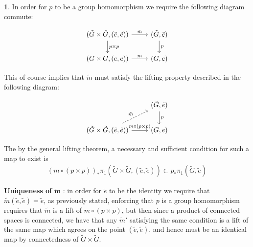 \documentclass[10.5pt]{article}
\theoremstyle{definition}
\newtheorem{pb}{}
\begin{document}
    \newpage
    \begin{pb}
        In order for \(p\) to be a group homomorphism we require the following diagram commute:

        \begin{equation*} 
            \begin{tikzcd}
                (\tilde{G} \times \tilde{G},(\tilde{e},\tilde{e}))\arrow[r, "\tilde{m}"] \arrow[d, "p \times p"]& (\tilde{G},\tilde{e})\arrow[d, "p"]\\
                (G\times G, (e,e))\arrow[r, "m"]& (G,e)
            \end{tikzcd}
        \end{equation*}

        This of course implies that \(\tilde{m}\) must satisfy the lifting property described in the following diagram:

        \begin{equation*}
            \begin{tikzcd}
                &(\tilde{G},\tilde{e})\ar[d, "p"]\\
                (\tilde{G} \times \tilde{G},(\tilde{e},\tilde{e}))\ar[r, "m\circ (p \times p)"]\ar[ru, "\tilde{m}", dashed]&(G,e)
                \end{tikzcd}
        \end{equation*}

        The by the general lifting theorem, a necessary and sufficient condition for such a map to exist is
        \begin{align*}
            (m\circ(p\times p))_*\pi_1(\tilde{G}\times\tilde{G},(\tilde{e},\tilde{e})) \subset p_* \pi_1(\tilde{G},\tilde{e})
        \end{align*}

        \textbf{Uniqueness of} \(\mathbf{\tilde{m}}\) :
        in order for \(\tilde{e}\) to be the identity we require that \(\tilde{m}(\tilde{e},\tilde{e}) = \tilde{e}\), as previously stated, enforcing that \(p\) is a group homomorphism requires that \(\tilde{m}\) is a lift of \(m \circ (p \times p)\), but then since a product of connected spaces is connected, we have that any \(\tilde{m}'\) satisfying the same condition is a lift of the same map which agrees on the point \((\tilde{e},\tilde{e})\), and hence must be an identical map by connectedness of \(\tilde{G}\times \tilde{G}\).


\end{pb}
\end{document}
